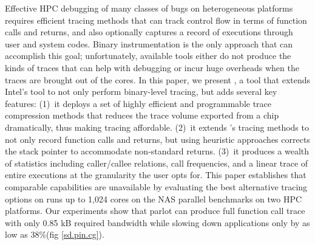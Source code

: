 Effective HPC debugging of many classes of bugs on heterogeneous
platforms requires efficient tracing methods that can track control
flow in terms of function calls and returns, and also optionally
captures a record of executions through user and system codes.
%
Binary instrumentation is the only approach that can accomplish this
goal; unfortunately, available tools either do not produce the kinds
of traces that can help with debugging or incur huge overheads when
the traces are brought out of the cores.
%
In this paper, we present \parlot,  a tool that extends Intel's \pin
tool to not only perform binary-level tracing, but adds several  key
features: (1)~it deploys a set of highly efficient and programmable
trace compression methods that reduces the trace volume exported 
from a chip dramatically, thus making tracing affordable.
(2)~it extends \pin's tracing methods to not only record function
calls and returns, but using heuristic approaches corrects the
stack pointer to accommodate non-standard returns.
(3)~it produces a wealth of statistics including caller/callee
relations, call frequencies, and a linear trace of entire executions
at the granularity the user opts for.
%
This paper establishes that comparable capabilities are 
unavailable by evaluating the best alternative tracing options
on runs up to 1,024 cores on the NAS parallel benchmarks on 
two HPC platforms.
%
Our experiments show that parlot can produce full function call trace with only 0.85 kB required bandwidth while slowing down applications only by as low as 38\%(fig \ref{sd.pin.cg}).
%
